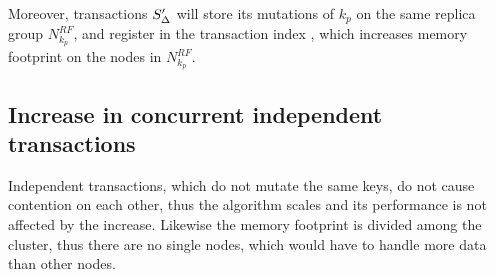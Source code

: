 Moreover, transactions $S'_{\text{$\Delta$}}$ will store its mutations of $k_p$ on the same replica group $N^{RF}_{k_p}$, and register in the transaction index \txIndex, which increases memory footprint on the nodes in $N^{RF}_{k_p}$.

\subsection{Increase in concurrent independent transactions}
Independent transactions, which do not mutate the same keys, do not cause contention on each other, thus the algorithm
scales and its performance is not affected by the increase. Likewise the memory footprint is divided among the cluster, thus there are no single nodes, which would have to handle more data than other nodes.







